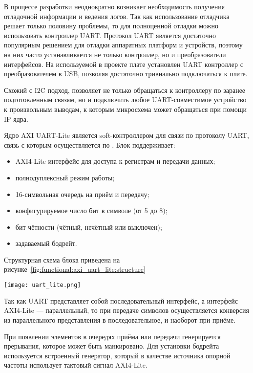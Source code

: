 В процессе разработки неоднократно возникает необходимость получения отладочной
информации и ведения логов. Так как использование отладчика решает только половину
проблемы, то для полноценной отладки можно использовать контроллер UART. Протокол
UART является достаточно популярным решением для отладки аппаратных платформ и устройств,
поэтому на них часто устанавливается не только контроллер, но и преобразователи
интерфейсов. На используемой в проекте плате установлен UART контроллер с преобразователем
в USB, позволяя достаточно тривиально подключаться к плате.

Схожий с I2C подход, позволяет не только обращаться к контроллеру по заранее подготовленным связям, но и
подключить любое UART-совместимое устройство к произвольным выводам, к которым микросхема может обращаться
при помощи IP-ядра.

Ядро AXI UART-Lite является soft-контроллером для связи по протоколу UART, связь с которым осуществляется
по . Блок поддерживает:
\begin{itemize}
  \item AXI4-Lite интерфейс для доступа к регистрам и передачи данных;
  \item полнодуплексный режим работы;
  \item 16-символьная очередь на приём и передачу;
  \item конфигурируемое число бит в символе (от 5 до 8);
  \item бит чётности (чётный, нечётный или выключен);
  \item задаваемый бодрейт.
\end{itemize}

Структурная схема блока приведена на рисунке~\ref{fig:functional:axi_uart_lite:structure}

\begin{center}
  \centering
  \texttt{[image: uart\_lite.png]}
  \label{fig:functional:axi_uart_lite:structure}
\end{center}

Так как UART представляет собой последовательный интерфейс, а интерфейс AXI4-Lite --- параллельный,
то при передаче символов осуществляется конверсия из параллельного представления в
последовательное, и наоборот при приёме.

При появлении элементов в очередях приёма или передачи генерируется прерывания,
которое может быть манкировано. Для установки бодрейта используется встроенный генератор,
который в качестве источника опорной частоты использует тактовый сигнал AXI4-Lite.

